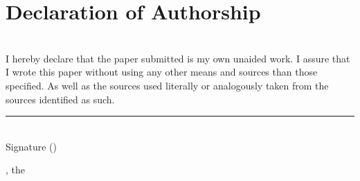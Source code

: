\section*{Declaration of Authorship}

\vspace{5cm}

~\\
I hereby declare that the paper submitted is my own unaided work. I assure that I wrote this paper without using any other means and sources than those specified. As well as the sources used literally or analogously taken from the sources identified as such.

\vspace{3cm}
\begin{flushright}

\rule{8cm}{0.2mm} \\
Signature (\myName)
\end{flushright}

\vspace{2cm}
\place, the \submission{}